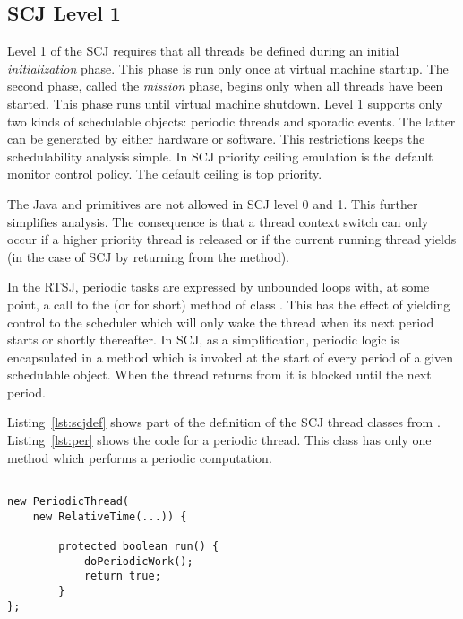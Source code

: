 \subsection{SCJ Level 1}

Level 1 of the SCJ requires that all threads be defined during an
initial \emph{initialization} phase. This phase is run only once at
virtual machine startup. The second phase, called the \emph{mission}
phase, begins only when all threads have been started. This phase
runs until virtual machine shutdown. Level 1 supports only two kinds
of schedulable objects: periodic threads and sporadic events. The
latter can be generated by either hardware or software. This
restrictions keeps the schedulability analysis simple. In SCJ
priority ceiling emulation is the default monitor control policy.
The default ceiling is top priority.

The Java  and  primitives are not allowed in
SCJ level 0 and 1. This further simplifies analysis. The consequence
is that a thread context switch can only occur if a higher priority
thread is released or if the current running thread yields (in the
case of SCJ by returning from the  method).

In the RTSJ, periodic tasks are expressed by unbounded loops with,
at some point, a call to the  (or
 for short) method of class . This
has the effect of yielding control to the scheduler which will only
wake the thread when its next period starts or shortly thereafter.
In SCJ, as a simplification, periodic logic is encapsulated in a
 method which is invoked at the start of every period of
a given schedulable object. When the thread returns from
 it is blocked until the next period.

Listing~\ref{lst:scjdef} shows part of the definition of the SCJ
thread classes from \cite{jop:scjava}. Listing~\ref{lst:per} shows
the code for a periodic thread. This class has only one 
method which performs a periodic computation.

\begin{lstlisting}[float=t,caption={A periodic application thread in SCJ},
label=lst:per]

new PeriodicThread(
    new RelativeTime(...)) {

        protected boolean run() {
            doPeriodicWork();
            return true;
        }
};
\end{lstlisting}

